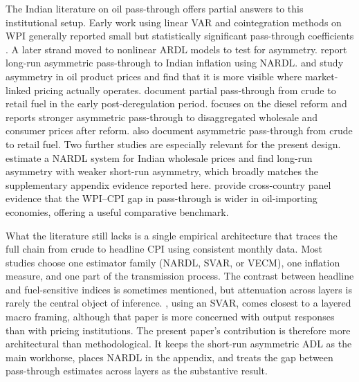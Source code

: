 \documentclass[11pt,a4paper]{article}
\begin{document}
The Indian literature on oil pass-through offers partial answers to this institutional setup. Early work using linear VAR and cointegration methods on WPI generally reported small but statistically significant pass-through coefficients \citep{bhoi2012,bhanumurthy2012}. A later strand moved to nonlinear ARDL models to test for asymmetry. \citet{abubakar2018} report long-run asymmetric pass-through to Indian inflation using NARDL. \citet{chattopadhyay2015} and \citet{pal2016} study asymmetry in oil product prices and find that it is more visible where market-linked pricing actually operates. \citet{pandey2019} document partial pass-through from crude to retail fuel in the early post-deregulation period. \citet{pradeep2022} focuses on the diesel reform and reports stronger asymmetric pass-through to disaggregated wholesale and consumer prices after reform. \citet{deheri2024} also document asymmetric pass-through from crude to retail fuel. Two further studies are especially relevant for the present design. \citet{suresh2026} estimate a NARDL system for Indian wholesale prices and find long-run asymmetry with weaker short-run asymmetry, which broadly matches the supplementary appendix evidence reported here. \citet{sek2019} provide cross-country panel evidence that the WPI--CPI gap in pass-through is wider in oil-importing economies, offering a useful comparative benchmark.

What the literature still lacks is a single empirical architecture that traces the full chain from crude to headline CPI using consistent monthly data. Most studies choose one estimator family (NARDL, SVAR, or VECM), one inflation measure, and one part of the transmission process. The contrast between headline and fuel-sensitive indices is sometimes mentioned, but attenuation across layers is rarely the central object of inference. \citet{sadath2021}, using an SVAR, comes closest to a layered macro framing, although that paper is more concerned with output responses than with pricing institutions. The present paper's contribution is therefore more architectural than methodological. It keeps the short-run asymmetric ADL as the main workhorse, places NARDL in the appendix, and treats the gap between pass-through estimates across layers as the substantive result.
\end{document}
